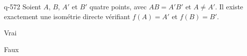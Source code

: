 \begin{truefalse}{q-572}
Soient $A$, $B$, $A'$ et $B'$  quatre points, avec $AB=A'B'$ et $A\neq A'$. Il existe exactement une isométrie directe vérifiant $f(A)=A'$ et $f(B)=B'$.
\item Vrai
\item* Faux
\end{truefalse}

